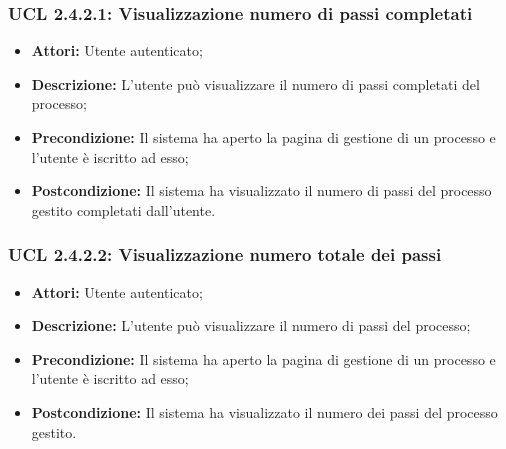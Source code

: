 \hypertarget{L2.4.2.1}{}
\subsubsection{UCL 2.4.2.1: Visualizzazione numero di passi completati}
\begin{itemize}
\item \textbf{Attori:} Utente autenticato;
\item \textbf{Descrizione:} L'utente può visualizzare il numero di passi completati del processo;
\item \textbf{Precondizione:} Il sistema ha aperto la pagina di gestione di un processo e l'utente è iscritto ad esso;
\item \textbf{Postcondizione:} Il sistema ha visualizzato il numero di passi del processo gestito completati dall'utente.
\end{itemize}

\hypertarget{L2.4.2.2}{}
\subsubsection{UCL 2.4.2.2: Visualizzazione numero totale dei passi}
\begin{itemize}
\item \textbf{Attori:} Utente autenticato;
\item \textbf{Descrizione:} L'utente può visualizzare il numero di passi del processo;
\item \textbf{Precondizione:} Il sistema ha aperto la pagina di gestione di un processo e l'utente è iscritto ad esso;
\item \textbf{Postcondizione:} Il sistema ha visualizzato il numero dei passi del processo gestito.
\end{itemize}

\hypertarget{L2.4.2.3}{}

